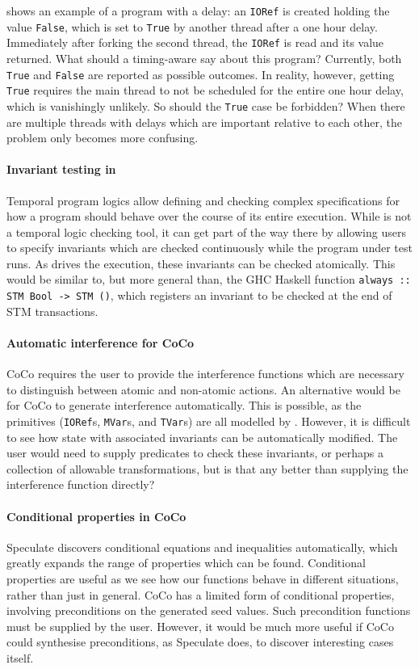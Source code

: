  shows an example of a program with a delay: an
\verb|IORef| is created holding the value \verb|False|, which is set to
\verb|True| by another thread after a one hour delay.  Immediately
after forking the second thread, the \verb|IORef| is read and its value
returned.  What should a timing-aware \dejafu{} say about this
program?  Currently, both \verb|True| and \verb|False| are reported as
possible outcomes.  In reality, however, getting \verb|True| requires
the main thread to not be scheduled for the entire one hour delay,
which is vanishingly unlikely.  So should the \verb|True| case be
forbidden?  When there are multiple threads with delays which are
important relative to each other, the problem only becomes more
confusing.

\paragraph{Invariant testing in \dejafu{}}
Temporal program logics \parencite{pnueli1977} allow defining and
checking complex specifications for how a program should behave over
the course of its entire execution.  While \dejafu{} is not a temporal
logic checking tool, it can get part of the way there by allowing
users to specify invariants which are checked continuously while the
program under test runs.  As \dejafu{} drives the execution, these
invariants can be checked atomically.  This would be similar to, but
more general than, the GHC Haskell function
\verb|always :: STM Bool -> STM ()|, which registers an invariant to
be checked at the end of STM transactions.

\paragraph{Automatic interference for CoCo}
CoCo requires the user to provide the interference functions which are
necessary to distinguish between atomic and non-atomic actions.  An
alternative would be for CoCo to generate interference automatically.
This is possible, as the primitives (\verb|IORef|s, \verb|MVar|s, and
\verb|TVar|s) are all modelled by \dejafu{}.  However, it is difficult
to see how state with associated invariants can be automatically
modified.  The user would need to supply predicates to check these
invariants, or perhaps a collection of allowable transformations, but
is that any better than supplying the interference function directly?

\paragraph{Conditional properties in CoCo}
Speculate \parencite{braquehais2017} discovers conditional equations
and inequalities automatically, which greatly expands the range of
properties which can be found.  Conditional properties are useful as
we see how our functions behave in different situations, rather than
just in general.  CoCo has a limited form of conditional properties,
involving preconditions on the generated seed values.  Such
precondition functions must be supplied by the user.  However, it
would be much more useful if CoCo could synthesise preconditions, as
Speculate does, to discover interesting cases itself.

